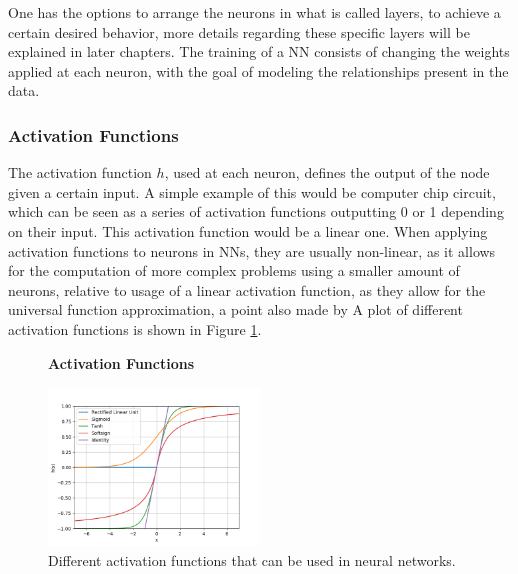 One has the options to arrange the neurons in what is called layers, to achieve
a certain desired behavior, more details regarding these specific layers will
be explained in later chapters. The training of a \gls{NN} consists of changing
the weights applied at each neuron, with the goal of modeling the relationships
present in the data.

\subsubsection{Activation Functions}

The activation function $h$, used at each neuron, defines the output of the
node given a certain input. A simple example of this would be computer chip
circuit, which can be seen as a series of activation functions outputting 0 or
1 depending on their input. This activation function would be a linear one.
When applying activation functions to neurons in \gls{NN}s, they are usually
non-linear, as it allows for the computation of more complex problems using a
smaller amount of neurons, relative to usage of a linear activation function,
as they allow for the universal function approximation, a point also made by
\cite{6797088} A plot of different activation functions is shown in Figure
\ref{fig:activation_functions}.

\begin{figure}
    \centering
    \textbf{Activation Functions}\par\medskip
    \includegraphics[width=0.5\textwidth]{./pictures/method/activation_functions.png}
    \caption{Different activation functions that can be used in neural
        networks.}
    \label{fig:activation_functions}
\end{figure}

